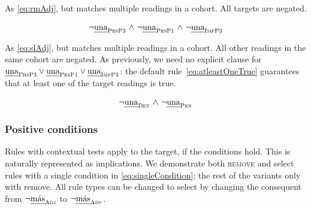 



 As \ref{eq:rmAdj}, but matches multiple readings in a cohort. All targets are negated.

\begin{equation}
\begin{array}{c @{~\wedge~} c @{~\wedge~} c}
\neg{} \unaPrsPThree  & \neg \unaPrsPOne & \neg \unaImp
\end{array}
\label{eq:rmVb}
\end{equation}

 As \ref{eq:slAdj}, but matches multiple readings in a cohort. All other readings in the same cohort are negated.
As previously, we need no explicit clause for $\text{\em una}_{\text{\sc PrsP3}}  \vee \text{\em una}_{\text{\sc PrsP1}} \vee \text{\em una}_{\text{\sc ImpP3}}$: the default rule~\ref{eq:atleastOneTrue} guarantees that at least one of the target readings is true.

\begin{equation}
\begin{array}{c @{~\wedge~} c}
\neg \unaDet & \neg \unaPrn \\
\end{array}
\label{eq:slVb}
\end{equation}


\subsubsection{Positive conditions}

Rules with contextual tests apply to the target, if the conditions hold.
This is naturally represented as implications. We demonstrate both \textsc{remove} and {\sc select} rules with a single condition in \ref{eq:singleCondition}; the rest of the variants only with {\sc remove}. All rule types can be changed to {\sc select} by changing the consequent from $\neg{}\text{\em m\'{a}s}_{\text{\sc Adj}}$ to $\neg{}\text{\em m\'{a}s}_{\text{\sc Adv}}$. %


